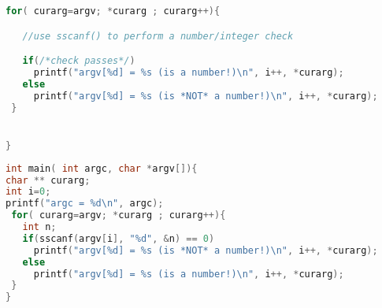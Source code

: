 \documentclass{article}[9pt]
\newenvironment{answerfont}{\fontfamily{qhv}\selectfont}{\par}
\newenvironment{myanswer}{\begin{mdframed}\begin{answerfont}}{\end{answerfont}\end{mdframed}}
\begin{document}
\begin{enumerate}
\begin{lstlisting}[language=c]
 for( curarg=argv; *curarg ; curarg++){

   //use sscanf() to perform a number/integer check

   if(/*check passes*/)
     printf("argv[%d] = %s (is a number!)\n", i++, *curarg);
   else
     printf("argv[%d] = %s (is *NOT* a number!)\n", i++, *curarg);
 }


}
\end{lstlisting}

\begin{myanswer}
\begin{lstlisting}[language=c]
int main( int argc, char *argv[]){
char ** curarg;
int i=0;
printf("argc = %d\n", argc);
 for( curarg=argv; *curarg ; curarg++){
   int n;
   if(sscanf(argv[i], "%d", &n) == 0)
     printf("argv[%d] = %s (is *NOT* a number!)\n", i++, *curarg);
   else
     printf("argv[%d] = %s (is a number!)\n", i++, *curarg);
 }
}
\end{lstlisting}
\end{myanswer}


\end{enumerate}
\end{document}
